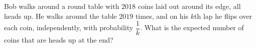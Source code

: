 Bob walks around a round table with $2018$ coins laid out around its edge, all heads up. He walks around the table $2019$ times, and on his $k$th lap he flips over each coin, independently, with probability $\dfrac1k$. What is the expected number of coins that are heads up at the end?
